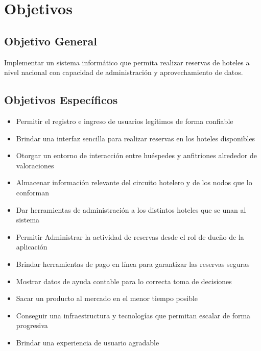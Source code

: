 \section{Objetivos}

\subsection{Objetivo General}

Implementar un sistema informático que permita realizar reservas de hoteles a nivel nacional con capacidad de administración y aprovechamiento de datos.

\subsection{Objetivos Específicos}

\begin{itemize}
\item Permitir el registro e ingreso de usuarios legítimos de forma confiable
\item Brindar una interfaz sencilla para realizar reservas en los hoteles disponibles
\item Otorgar un entorno de interacción entre huéspedes y anfitriones alrededor de valoraciones
\item Almacenar información relevante del circuito hotelero y de los nodos que lo conforman
\item Dar herramientas de administración a los distintos hoteles que se unan al sistema
\item Permitir Administrar la actividad de reservas desde el rol de dueño de la aplicación
\item Brindar herramientas de pago en línea para garantizar las reservas seguras
\item Mostrar datos de ayuda contable para lo correcta toma de decisiones
\item Sacar un producto al mercado en el menor tiempo posible
\item Conseguir una infraestructura y tecnologías que permitan escalar de forma progresiva
\item Brindar una experiencia de usuario agradable
\end{itemize}
